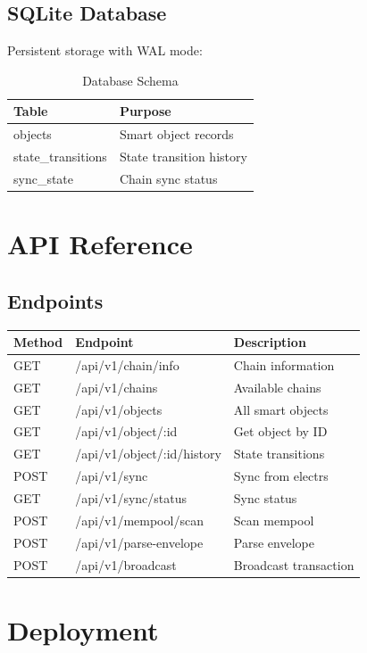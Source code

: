 \documentclass[a4paper,11pt]{article}
\begin{document}
\subsection{SQLite Database}

Persistent storage with WAL mode:

\begin{table}[h]
\centering
\begin{tabular}{@{}ll@{}}
\toprule
\textbf{Table} & \textbf{Purpose} \\
\midrule
objects & Smart object records \\
state\_transitions & State transition history \\
sync\_state & Chain sync status \\
\bottomrule
\end{tabular}
\caption{Database Schema}
\end{table}

\section{API Reference}

\subsection{Endpoints}

\begin{longtable}{@{}lll@{}}
\toprule
\textbf{Method} & \textbf{Endpoint} & \textbf{Description} \\
\midrule
\endhead
GET & /api/v1/chain/info & Chain information \\
GET & /api/v1/chains & Available chains \\
GET & /api/v1/objects & All smart objects \\
GET & /api/v1/object/:id & Get object by ID \\
GET & /api/v1/object/:id/history & State transitions \\
POST & /api/v1/sync & Sync from electrs \\
GET & /api/v1/sync/status & Sync status \\
POST & /api/v1/mempool/scan & Scan mempool \\
POST & /api/v1/parse-envelope & Parse envelope \\
POST & /api/v1/broadcast & Broadcast transaction \\
\bottomrule
\end{longtable}

\section{Deployment}
\end{document}

